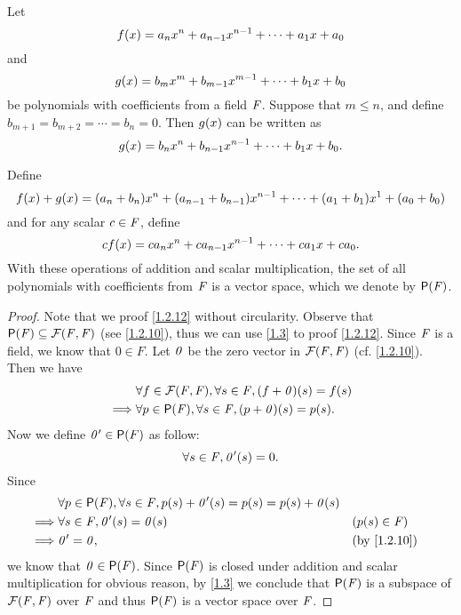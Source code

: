 \begin{eg}\label{1.2.12}
  Let
  \[
    f\p{x} = a_{n} x^{n} + a_{n - 1} x^{n - 1} + \cdots + a_{1} x + a_{0}
  \]
  and
  \[
    g\p{x} = b_{m} x^{m} + b_{m - 1} x^{m - 1} + \cdots + b_{1} x + b_{0}
  \]
  be polynomials with coefficients from a field \(\mathit{F}\).
  Suppose that \(m \leq n\), and define \(b_{m + 1} = b_{m + 2} = \cdots = b_{n} = 0\).
  Then \(g\p{x}\) can be written as
  \[
    g\p{x} = b_{n} x^{n} + b_{n - 1} x^{n - 1} + \cdots + b_{1} x + b_{0}.
  \]

  Define
  \[
    f\p{x} + g\p{x} = \p{a_{n} + b_{n}} x^{n} + \p{a_{n - 1} + b_{n - 1}} x^{n - 1} + \cdots + \p{a_{1} + b_{1}} x^{1} + \p{a_{0} + b_{0}}
  \]
  and for any scalar \(c \in \mathit{F}\), define
  \[
    cf\p{x} = ca_{n} x^{n} + ca_{n - 1} x^{n - 1} + \cdots + ca_{1} x + ca_{0}.
  \]
  With these operations of addition and scalar multiplication, the set of all polynomials with coefficients from \(\mathit{F}\) is a vector space, which we denote by \(\ps{\F}\).
\end{eg}

\begin{proof}
  Note that we proof \cref{1.2.12} without circularity.
  Observe that \(\ps{\F} \subseteq \fs{\F}{\F}\) (see \cref{1.2.10}), thus we can use \cref{1.3} to proof \cref{1.2.12}.
  Since \(\mathit{F}\) is a field, we know that \(0 \in F\).
  Let \(\mathit{0}\) be the zero vector in \(\fs{\F}{\F}\) (cf. \cref{1.2.10}).
  Then we have
  \begin{align*}
             & \forall f \in \fs{\F}{\F}, \forall s \in \F, \p{f + \zv}\p{s} = f\p{s} \\
    \implies & \forall p \in \ps{\F}, \forall s \in \F, \p{p + \zv}\p{s} = p\p{s}.
  \end{align*}
  Now we define \(\zv' \in \ps{F}\) as follow:
  \[
    \forall s \in \F, \zv'\p{s} = 0.
  \]
  Since
  \begin{align*}
             & \forall p \in \ps{\F}, \forall s \in \F, p\p{s} + \zv'\p{s} = p\p{s} = p\p{s} + \zv\p{s}                                \\
    \implies & \forall s \in \F, \zv'\p{s} = \zv\p{s}                                                   &  & (p\p{s} \in \F)           \\
    \implies & \zv' = \zv,                                                                              &  & \text{(by \cref{1.2.10})}
  \end{align*}
  we know that \(\zv \in \ps{\F}\).
  Since \(\ps{\F}\) is closed under addition and scalar multiplication for obvious reason, by \cref{1.3} we conclude that \(\ps{\F}\) is a subspace of \(\fs{\F}{\F}\) over \(\mathit{F}\) and thus \(\ps{\F}\) is a vector space over \(\mathit{F}\).
\end{proof}

